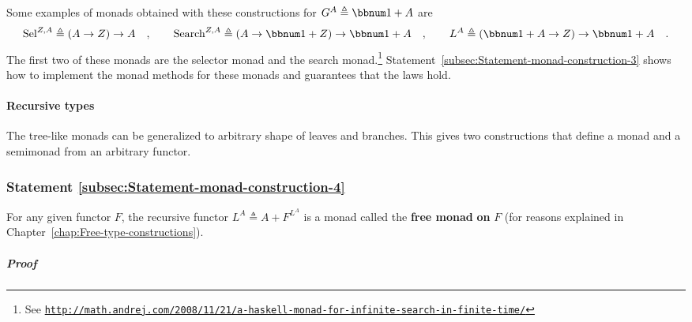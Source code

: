 Some examples of monads obtained with these constructions for $G^{A}\triangleq\bbnum 1+A$
are
\[
\text{Sel}^{Z,A}\triangleq\left(A\rightarrow Z\right)\rightarrow A\quad,\quad\quad\text{Search}^{Z,A}\triangleq\left(A\rightarrow\bbnum 1+Z\right)\rightarrow\bbnum 1+A\quad,\quad\quad L^{A}\triangleq\left(\bbnum 1+A\rightarrow Z\right)\rightarrow\bbnum 1+A\quad.
\]
The first two of these monads are the selector monad
and the search monad.\footnote{See \texttt{\href{http://math.andrej.com/2008/11/21/a-haskell-monad-for-infinite-search-in-finite-time/}{http://math.andrej.com/2008/11/21/a-haskell-monad-for-infinite-search-in-finite-time/}}}
Statement~\ref{subsec:Statement-monad-construction-3} shows how
to implement the monad methods for these monads and guarantees that
the laws hold.

\paragraph{Recursive types}

The tree-like monads can be generalized to arbitrary shape of leaves
and branches. This gives two constructions that define a monad and
a semimonad from an arbitrary functor.

\subsubsection{Statement \label{subsec:Statement-monad-construction-4}\ref{subsec:Statement-monad-construction-4}}

For any given functor $F$, the recursive functor $L^{A}\triangleq A+F^{L^{A}}$
is a monad called the \textbf{free monad}\textbf{
on} $F$ (for reasons explained in Chapter~\ref{chap:Free-type-constructions}).

\subparagraph{Proof}

